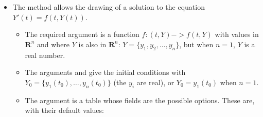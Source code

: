 \begin{itemize}
\begin{demo}{A Lotka-Volterra differential system}
\begin{luadraw}{name=lotka_volterra}
local ld = luadraw
local cpx = ld.cpx
local g = ld.graph:new{window={-5,50,-0.5,5},size={10,10,0}, border=true}
local i = cpx.I
local f = function(t,y) return {y[1]-y[1]*y[2],-y[2]+y[1]*y[2]} end
g:Labelsize("footnotesize")
g:Daxes({0,10,1},{limits={{0,50},{0,4}}, nbsubdiv={4,0}, legendsep={0.1,0},
originpos={"center","center"}, legend={"$t$",""}})
local y0 = {2,2}
local M = ld.odesolve(f,0,y0,0,50,250) -- approximate resolution
-- M est une table à 3 éléments: t, x et y
g:Lineoptions("solid","blue",8)
g:Dseg({5+3.5*i,10+3.5*i}); g:Dlabel("$x$",10+3.5*i,{pos="E"})
g:DplotXY(M[1],M[2]) -- points (t,x(t))
g:Linecolor("red"); g:Dseg({5+3*i,10+3*i}); g:Dlabel("$y$",10+3*i,{pos="E"})
g:DplotXY(M[1],M[3]) -- points (t,y(t))
g:Lineoptions(nil,"black",4)
g:Saveattr(); g:Viewport(20,50,3,5) -- change of view
g:Coordsystem(-0.5,3.25,-0.5,3.25) -- new associated landmark
g:Daxes({0,1,1},{legend={"$x$","$y$"},arrows="->"})
g:Lineoptions(nil,"ForestGreen",8); g:DplotXY(M[2],M[3]) -- points (x(t),y(t))
g:Restoreattr() -- back to the old view
g:Dlabel("$\\begin{cases}x'=x-xy\\\\y'=-y+xy\\end{cases}$", 5+4.75*i,{})
g:Show()
\end{luadraw}
\end{demo}
    
    \item The method  allows the drawing of a solution to the equation \(Y'(t)=f(t,Y(t))\).
\begin{itemize}
    \item The required argument  is a function \(f: (t,Y) -> f(t,Y)\) with values ​​in \(\mathbf R^n\) and where $Y$ is also in \(\mathbf R^n\): $Y=\{y_1,y_2,\ldots,y_n\}$, but when $n=1$, $Y$ is a real number.
    \item The arguments  and  give the initial conditions with $Y_0=\{y_1(t_0),\ldots,y_n(t_0)\}$ (the $y_i$ are real), or $Y_0=y_1(t_0)$ when $n=1$.
    \item The argument  is a table whose fields are the possible options. These are, with their default values:


\end{itemize}
\end{itemize}
